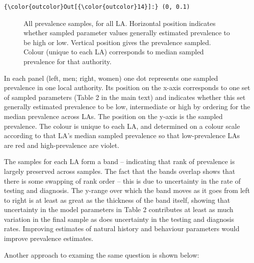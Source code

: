 \documentclass{article}
\begin{document}
    \begin{footnotesize}
            \begin{Verbatim}[commandchars=\\\{\}]
{\color{outcolor}Out[{\color{outcolor}14}]:} (0, 0.1)
\end{Verbatim}
    \end{footnotesize}
        
    \begin{figure}
        \begin{center}\end{center}
        \caption{All prevalence samples, for all LA. Horizontal position indicates whether sampled parameter values generally estimated prevalence to be high or low. Vertical position gives the prevalence sampled. Colour (unique to each LA) corresponds to median sampled prevalence for that authority.}
        \label{}
    \end{figure}
    
    In each panel (left, men; right, women) one dot represents one sampled
prevalence in one local authority. Its position on the x-axis
corresponds to one set of sampled parameters (Table 2 in the main text)
and indicates whether this set generally estimated prevalence to be low,
intermediate or high by ordering for the median prevalence across LAs.
The position on the y-axis is the sampled prevalence. The colour is
unique to each LA, and determined on a colour scale according to that
LA's median sampled prevalence so that low-prevalence LAs are red and
high-prevalence are violet.

The samples for each LA form a band -- indicating that rank of
prevalence is largely preserved across samples. The fact that the bands
overlap shows that there is some swapping of rank order -- this is due
to uncertainty in the rate of testing and diagnosis. The y-range over
which the band moves as it goes from left to right is at least as great
as the thickness of the band itself, showing that uncertainty in the
model parameters in Table 2 contributes at least as much variation in
the final sample as does uncertainty in the testing and diagnosis rates.
Improving estimates of natural history and behaviour parameters would
improve prevalence estimates.

Another approach to examing the same question is shown below:
\end{document}
